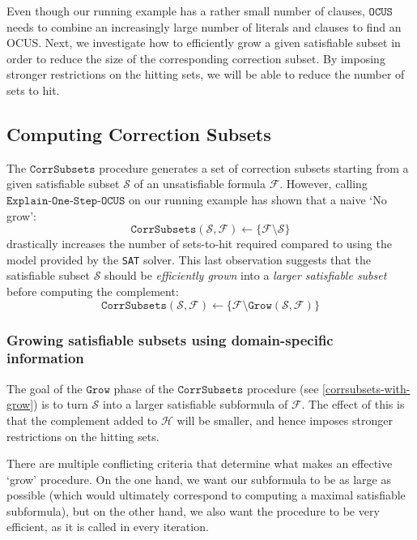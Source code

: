 \documentclass[twoside,11pt]{article}
\newcommand\m[1]{\mathcal{#1}}
\newcommand\comment[1]{\marginpar{\tiny #1}}
\renewcommand\comment[1]{#1}
\newcommand{\emilio}[1]{{\comment{\color{red}Emilio: #1}}}
\newcommand\setstohit{\ensuremath{\m{H} }\xspace}
\newcommand\subsetT{\ensuremath{\m{S} }\xspace}
\newcommand\formula{\ensuremath{\m{F} }\xspace}
\newcommand\mm[1]{\ensuremath{#1}\xspace}
\newcommand\call[1]{\mm{\texttt{#1}}}
\newcommand\sat{\texttt{{SAT}}\xspace}
\newcommand\grow{\mm{\call{Grow}}}
\newcommand\comus{\mm{\call{OCUS}}}
\newcommand\corrsubsets{\mm{\call{CorrSubsets}}}
\newcommand\onestepo{\ensuremath{\call{Explain-One-Step-OCUS}}\xspace}
\begin{document}
	Even though our running example has a rather small number of clauses, \comus needs to combine an increasingly large number of literals and clauses to find an OCUS. 
	Next, we investigate how to efficiently grow a given satisfiable subset in order to reduce the size of the corresponding correction subset. By imposing stronger restrictions on the hitting sets, we will be able to reduce the number of sets to hit.
	
	\subsection{Computing Correction Subsets}\label{sec:computing-correction-subsets}
	
	The \corrsubsets procedure generates a set of correction subsets starting from a given satisfiable subset $\subsetT$ of an unsatisfiable formula $\formula$. 
	However, calling \onestepo on our running example has shown that a naive `No grow':
	\begin{equation}\label{corrsubsets-no-grow}
		\corrsubsets(\subsetT, \formula) \gets \{\formula \setminus  \subsetT \}
	\end{equation}
	drastically increases the number of sets-to-hit required compared to using the model provided by the \sat solver. 
	This last observation suggests that the satisfiable subset $\m{S}$ should be \emph{efficiently grown} into a \emph{larger satisfiable subset} before computing the complement:
	\begin{equation}\label{corrsubsets-with-grow}
		\corrsubsets(\subsetT, \formula) \gets \{\formula \setminus  \grow(\subsetT, \formula) \}
	\end{equation}
	
	\subsubsection{Growing satisfiable subsets using domain-specific information} \label{para:domainspecificgrow}
	
	The goal of the \grow phase of the \corrsubsets procedure (see \cref{corrsubsets-with-grow}) is to turn $\m{S}$ into a larger satisfiable subformula of $\formula$. 
	The effect of this is that the complement added to \setstohit will be smaller, and hence imposes stronger restrictions on the hitting sets.
	
	There are multiple conflicting criteria that determine what makes an effective `grow' procedure.
	On the one hand, we want our subformula to be as large as possible (which would ultimately correspond to computing a maximal satisfiable subformula), %
	but on the other hand, we also want the procedure to be very efficient, as it is called in every iteration. 
	
\end{document}
